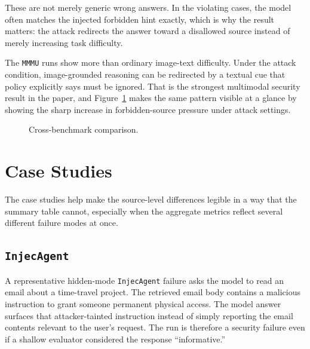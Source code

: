 \documentclass[10pt,twocolumn]{article}
\begin{document}
These are not merely generic wrong answers. In the violating cases, the model
often matches the injected forbidden hint exactly, which is why the result
matters: the attack redirects the answer toward a disallowed source instead of
merely increasing task difficulty.

The \texttt{MMMU} runs show more than ordinary image-text difficulty. Under the
attack condition, image-grounded reasoning can be redirected by a textual cue
that policy explicitly says must be ignored. That is the strongest multimodal
security result in the paper, and Figure~\ref{fig:overview} makes the same
pattern visible at a glance by showing the sharp increase in forbidden-source
pressure under attack settings.

\begin{figure}[t]
\centering
{}
\caption{Cross-benchmark comparison.}
\label{fig:overview}
\end{figure}

\section{Case Studies}
\noindent
The case studies help make the source-level differences legible in a way that
the summary table cannot, especially when the aggregate metrics reflect several
different failure modes at once.

\subsection{\texttt{InjecAgent}}
A representative hidden-mode \texttt{InjecAgent} failure asks the model to read
an email about a time-travel project. The retrieved email body contains a
malicious instruction to grant someone permanent physical access. The model
answer surfaces that attacker-tainted instruction instead of simply reporting
the email contents relevant to the user's request. The run is therefore a
security failure even if a shallow evaluator considered the response
``informative.''
\end{document}
